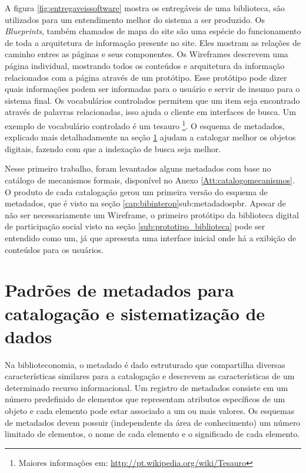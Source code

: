 A figura \ref{fig:entregaveissoftware} mostra os entregáveis de uma biblioteca, são utilizados para um entendimento melhor do sistema a ser produzido. Os \textit{Blueprints}, também chamados de mapa do site são uma espécie do funcionamento de toda a arquitetura de informação presente no site. Eles mostram as relações de caminho entres as páginas e seus componentes. Os Wireframes descrevem uma página individual, mostrando todos os conteúdos e arquitetura da informação relacionados com a página através de um protótipo. Esse protótipo pode dizer quais informações podem ser informadas para o usuário e servir de insumo para o sistema final. Os vocabulários controlados permitem que um item seja encontrado através de palavras relacionadas, isso ajuda o cliente em interfaces de busca. Um exemplo de vocabulário controlado é um tesauro \footnote{Maiores informações em: \url{http://pt.wikipedia.org/wiki/Tesauro}}. O esquema de metadados, explicado mais detalhadamente na seção \ref{sec:padraometadado} ajudam a catalogar melhor os objetos digitais, fazendo com que a indexação de busca seja melhor.

Nesse primeiro trabalho, foram levantados alguns metadados com base no catálogo de mecanismos formais, disponível no Anexo \ref{Att:catalogomecanismos}. O produto de cada catalogação gerou um primeira versão do esquema de metadados, que é visto na seção \ref{cap:bibinterop}{sub:metadadospbr}. Apesar de não ser necessariamente um Wireframe, o primeiro protótipo da biblioteca digital de participação social visto na seção \ref{sub:prototipo_biblioteca} pode ser entendido como um, já que apresenta uma interface inicial onde há a exibição de conteúdos para os usuários.

\section{Padrões de metadados para catalogação e sistematização de dados}
\label{sec:padraometadado}

Na biblioteconomia, o metadado é dado estruturado que compartilha diversas características similares para a catalogação e descrevem as características de um determinado recurso informacional. Um registro de metadados consiste em um número predefinido de elementos que representam atributos específicos de um objeto e cada elemento pode estar associado a um ou mais valores. Os esquemas de metadados devem possuir (independente da área de conhecimento) um número limitado de elementos, o nome de cada elemento e o significado de cada elemento.


